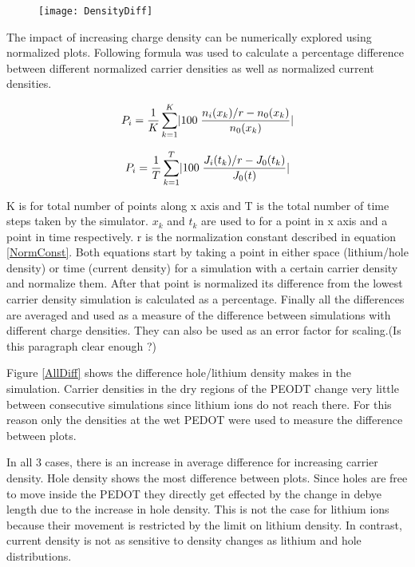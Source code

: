 {\begin{figure}[!htp]
\centering
\texttt{[image: DensityDiff]}
\caption{} 
\label{DensityDiff}
\end{figure}

The impact of increasing charge density can be numerically explored using normalized plots. Following formula was used to calculate a percentage difference between different normalized carrier densities as well as normalized current densities. 


\begin{equation}
\centering
P_i = \frac{1}{ K}\sum_{k=1}^{K}\lvert 100 \;\frac{n_{i}(x_k)/r-n_{0}(x_k)}{n_{0}(x_k)}\rvert
\end{equation}

\begin{equation}
\centering
P_i = \frac{1}{ T}\sum_{k=1}^{T}\lvert 100 \;\frac{J_{i}(t_k)/r-J_{0}(t_k)}{J_{0}(t)}\rvert
\end{equation}


K is for total number of points along x axis and T is the total number of time steps taken by the simulator. $x_{k}$ and $t_{k}$ are used to for a point in x axis and a point in time respectively. r is the normalization constant described in equation \ref{NormConst}. Both equations start by taking a point in either space (lithium/hole density) or time (current density) for a simulation with a certain carrier density and normalize them. After that point is normalized its difference from the lowest carrier density simulation is calculated as a percentage. Finally all the differences are averaged and used as a measure of the difference between simulations with different charge densities. They can also be used as an error factor for scaling.(Is this paragraph clear enough ?)  

Figure \ref{AllDiff} shows the difference hole/lithium density makes in the simulation. Carrier densities in the dry regions of the PEODT change very little between consecutive simulations since lithium ions do not reach there. For this reason only the densities at the wet PEDOT were used to measure the difference between plots. 

In all 3 cases, there is an increase in average difference for increasing carrier density. Hole density shows the most difference between plots. Since holes are free to move inside the PEDOT they directly get effected by the change in debye length due to the increase in hole density. This is not the case for lithium ions because their movement is restricted by the limit on lithium density. In contrast, current density is not as sensitive to density changes as lithium and hole distributions.

}
